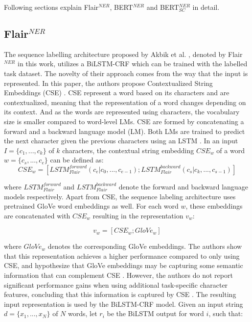\documentclass{report}
\theoremstyle{definition}
\theoremstyle{remark}
\begin{document}
Following sections explain Flair$^{NER}$, BERT$^{NER}$ and BERT$^{NER}_{SC}$ in detail.

\subsection{Flair$^{NER}$}
The sequence labelling architecture proposed by Akbik et al. \cite{flairpaper}, denoted by Flair$^{NER}$ in this work, utilizes a BiLSTM-CRF \cite{BiLSTMCRF} which can be trained with the labelled task dataset. The novelty of their approach comes from the way that the input is represented. In this paper, the authors propose Contextualized String Embeddings (CSE) \cite{flairpaper}. CSE represent a word based on its characters and are contextualized, meaning that the representation of a word changes depending on its context. And as the words are represented using characters, the vocabulary size is smaller compared to word-level LMs. CSE are formed by concatenating a forward and a backward language model (LM). Both LMs are trained to predict the next character given the previous characters using an LSTM \cite{lstm}. In an input $I=\{c_1,...,c_k\}$ of $k$ characters, the contextual string embedding $CSE_w$ of a word $w=\{c_s,...,c_e\}$ can be defined as:
\begin{equation}
    CSE_w = [ LSTM^{forward}_{Flair}(c_e | c_0,...,c_{e-1}); LSTM^{backward}_{Flair}(c_s | c_k,...,c_{s-1}) ]
\end{equation}

\noindent where $LSTM^{forward}_{Flair}$ and $LSTM^{backward}_{Flair}$ denote the forward and backward language models respectively. Apart from CSE, the sequence labeling architecture uses pretrained GloVe \cite{glove} word embeddings as well. For each word $w$, these embeddings are concatenated with $CSE_w$ resulting in the representation $v_w$:

\begin{equation}
    v_w = [CSE_w;GloVe_w]
\end{equation}

\noindent where $GloVe_w$ denotes the corresponding GloVe embeddings. The authors show that this representation achieves a higher performance compared to only using CSE, and hypothesize that GloVe embeddings may be capturing some semantic information that can complement CSE \cite{flairpaper}. However, the authors do not report significant performance gains when using additional task-specific character features, concluding that this information is captured by CSE \cite{flairpaper}. The resulting input representation is used by the BiLSTM-CRF model. Given an input string $d=\{x_1,...,x_N\}$ of $N$ words, let $r_i$ be the BiLSTM output for word $i$, such that:
\end{document}
